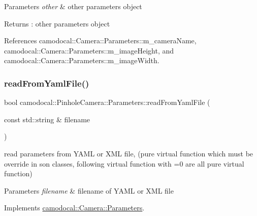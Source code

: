 \begin{DoxyParams}{Parameters}
{\em other} & other parameters object \\
\hline
\end{DoxyParams}
\begin{DoxyReturn}{Returns}
\+: other parameters object 
\end{DoxyReturn}


References camodocal\+::\+Camera\+::\+Parameters\+::m\+\_\+camera\+Name, camodocal\+::\+Camera\+::\+Parameters\+::m\+\_\+image\+Height, and camodocal\+::\+Camera\+::\+Parameters\+::m\+\_\+image\+Width.

\mbox{\label{classcamodocal_1_1PinholeCamera_1_1Parameters_a89d5834203e80ca6c09f60c47627c9a7}} 
\subsubsection{\texorpdfstring{read\+From\+Yaml\+File()}{readFromYamlFile()}}
{\footnotesize\ttfamily bool camodocal\+::\+Pinhole\+Camera\+::\+Parameters\+::read\+From\+Yaml\+File (\begin{DoxyParamCaption}\item[{const std\+::string \&}]{filename }\end{DoxyParamCaption})\hspace{0.3cm}{\ttfamily [virtual]}}



read parameters from Y\+A\+ML or X\+ML file, (pure virtual function which must be override in son classes, following virtual function with \textquotesingle{}=0\textquotesingle{} are all pure virtual function) 


\begin{DoxyParams}{Parameters}
{\em filename} & filename of Y\+A\+ML or X\+ML file \\
\hline
\end{DoxyParams}


Implements \hyperlink{classcamodocal_1_1Camera_1_1Parameters_a7968503df2a99e022a0c52bf7dafe531}{camodocal\+::\+Camera\+::\+Parameters}.



